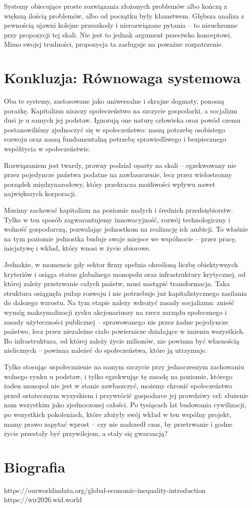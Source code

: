 \documentclass[12pt,a4paper]{article}
\begin{document}
Systemy obiecujące proste rozwiązania złożonych problemów albo kończą
z większą ilością problemów, albo od początku były kłamstwem. Głębsza
analiza z pewnością ujawni kolejne przeszkody i nierozwiązane pytania --
to nieuchronne przy propozycji tej skali. Nie jest to jednak argument
przeciwko konceptowi. Mimo swojej trudności, propozycja ta zasługuje na
poważne rozpatrzenie.

\section*{Konkluzja: Równowaga systemowa}

Oba te systemy, zastosowane jako uniwersalne i skrajne dogmaty, ponoszą porażkę. Kapitalizm niszczy społeczeństwo na szczycie gospodarki, a socjalizm dusi je u samych jej podstaw. Ignorują one naturę człowieka oraz powód czemu postanowiliśmy zjednoczyć się w społeczeństwo: naszą potrzebę osobistego rozwoju oraz naszą fundamentalną potrzebę sprawiedliwego i bezpiecznego współżycia w społeczeństwie.

Rozwiązaniem jest twardy, prawny podział oparty na skali -- egzekwowany nie przez pojedyncze państwa podatne na zawłaszczenie, lecz przez wielostronny porządek międzynarodowy, który przekracza możliwości wpływu nawet największych korporacji.

Musimy zachować kapitalizm na poziomie małych i średnich przedsiębiorstw. Tylko w ten sposób zagwarantujemy innowacyjność, rozwój technologiczny i wolność gospodarczą, pozwalając jednostkom na realizację ich ambicji. To właśnie na tym poziomie jednostka buduje swoje miejsce we wspólnocie -- przez pracę, inicjatywę i wkład, który wnosi w życie zbiorowe.

Jednakże, w momencie gdy sektor firmy spełnia określoną liczbę obiektywnych kryteriów i osiąga status globalnego monopolu oraz infrastruktury krytycznej, od której zależy przetrwanie całych państw, musi nastąpić transformacja. Taka struktura osiągnęła pułap rozwoju i nie potrzebuje już kapitalistycznego zasilania do dalszego wzrostu. Na tym etapie należy wdrożyć zasady socjalizmu: znieść wymóg maksymalizacji zysku akcjonariuszy na rzecz zarządu społecznego i zasady użyteczności publicznej -- sprawowanego nie przez żadne pojedyncze państwo, lecz przez niezależne ciało powiernicze działające w imieniu wszystkich. Bo infrastruktura, od której zależy życie milionów, nie powinna być własnością nielicznych -- powinna należeć do społeczeństwa, które ją utrzymuje.

Tylko stosując uspołecznienie na samym szczycie przy jednoczesnym zachowaniu wolnego rynku u podstaw, i tylko egzekwując tę zasadę na poziomie, którego żaden monopol nie jest w stanie zawłaszczyć, możemy chronić społeczeństwo przed ostatecznym wyzyskiem i przywrócić gospodarce jej prawdziwy cel: służenie nam wszystkim jako zjednoczonej całości. Po tysiącach lat budowania cywilizacji, po wszystkich pokoleniach, które złożyły swój wkład w ten wspólny projekt, mamy prawo zapytać wprost -- czy nie nadszedł czas, by przetrwanie i godne życie przestały być przywilejem, a stały się gwarancją?




\section*{Biografia}

https://ourworldindata.org/global-economic-inequality-introduction
https://wir2026.wid.world
\end{document}
